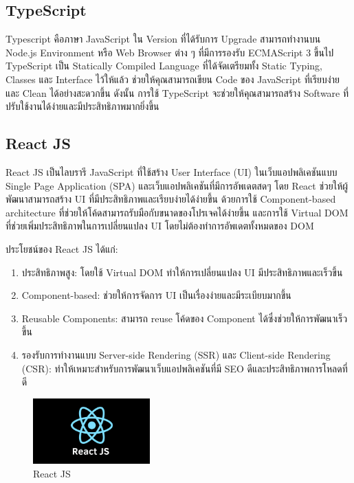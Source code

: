 \subsection{TypeScript}
Typescript \cite{web:typescript} คือภาษา JavaScript ใน Version ที่ได้รับการ Upgrade สามารถทำงานบน Node.js Environment หรือ Web Browser ต่าง ๆ ที่มีการรองรับ ECMAScript 3 ขึ้นไป TypeScript เป็น Statically Compiled Language ที่ได้จัดเตรียมทั้ง Static Typing, Classes และ Interface ไว้ให้แล้ว ช่วยให้คุณสามารถเขียน Code ของ JavaScript ที่เรียบง่ายและ Clean ได้อย่างสะดวกขึ้น ดังนั้น การใช้ TypeScript จะช่วยให้คุณสามารถสร้าง Software ที่ปรับใช้งานได้ง่ายและมีประสิทธิภาพมากยิ่งขึ้น

\subsection{React JS}
React JS \cite{web:reactjs} เป็นไลบรารี JavaScript ที่ใช้สร้าง User Interface (UI) ในเว็บแอปพลิเคชันแบบ Single Page Application (SPA) และเว็บแอปพลิเคชันที่มีการอัพเดตสดๆ โดย React ช่วยให้ผู้พัฒนาสามารถสร้าง UI ที่มีประสิทธิภาพและเรียบง่ายได้ง่ายขึ้น ด้วยการใช้ Component-based architecture ที่ช่วยให้โค้ดสามารถรับมือกับขนาดของโปรเจคได้ง่ายขึ้น และการใช้ Virtual DOM ที่ช่วยเพิ่มประสิทธิภาพในการเปลี่ยนแปลง UI โดยไม่ต้องทำการอัพเดตทั้งหมดของ DOM

ประโยชน์ของ React JS ได้แก่:

\begin{enumerate}
    \item ประสิทธิภาพสูง: โดยใช้ Virtual DOM ทำให้การเปลี่ยนแปลง UI มีประสิทธิภาพและเร็วขึ้น

    \item Component-based: ช่วยให้การจัดการ UI เป็นเรื่องง่ายและมีระเบียบมากขึ้น

    \item Reusable Components: สามารถ reuse โค้ดของ Component ได้ซึ่งช่วยให้การพัฒนาเร็วขึ้น

    \item รองรับการทำงานแบบ Server-side Rendering (SSR) และ Client-side Rendering (CSR): ทำให้เหมาะสำหรับการพัฒนาเว็บแอปพลิเคชันที่มี SEO ดีและประสิทธิภาพการโหลดที่ดี
\end{enumerate}

\begin{figure}
    \centering
    \includegraphics[width=0.4\textwidth]{img/reactjs.png}
    \caption{React JS}
    \label{fig:reactjs}
\end{figure}

